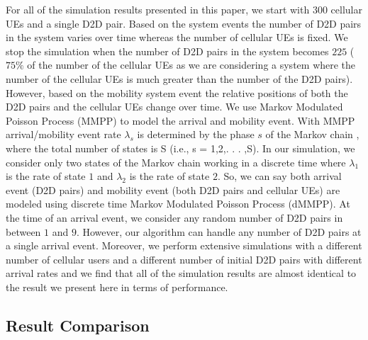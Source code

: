\documentclass[times]{dacauth}
\begin{document}
\noindent


\noindent
For all of the simulation results presented in this paper, we start with $300$ cellular UEs and a single D2D pair. Based on the system events the number of D2D pairs in the system varies over time whereas the number of cellular UEs is fixed. We stop the simulation when the number of D2D pairs in the system becomes $225$ ( $75\%$ of the number of the cellular UEs as we are considering a system where the number of the cellular UEs is much greater than the number of the D2D pairs). However, based on the mobility system event the relative positions of both the D2D pairs and the cellular UEs change over time. We use Markov Modulated Poisson Process (MMPP)\cite{salvador2003multiscale} to model the arrival and mobility event. With MMPP arrival/mobility event rate $\lambda_s$ is determined by the phase $s$ of the Markov chain \cite{stewart1994introduction}, where the total number of states is S (i.e., s = 1,2,. . . ,S). In our simulation, we consider only two states of the Markov chain working in a discrete time where $\lambda_1$ is the rate of state $1$ and $\lambda_2$ is the rate of state $2$. So, we can say both arrival event (D2D pairs) and mobility event (both D2D pairs and cellular UEs) are modeled using discrete time Markov Modulated Poisson Process (dMMPP). At the time of an arrival event, we consider any random number of D2D pairs in between $1$ and $9$. However, our algorithm can handle any number of D2D pairs at a single arrival event. Moreover, we perform extensive simulations with a different number of cellular users and a different number of initial D2D pairs with different arrival rates and we find that all of the simulation results are almost identical to the result we present here in terms of performance.

\noindent


\subsection{Result Comparison}
\end{document}

